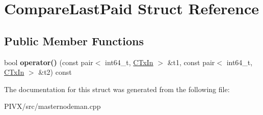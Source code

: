 \hypertarget{struct_compare_last_paid}{}\section{Compare\+Last\+Paid Struct Reference}
\label{struct_compare_last_paid}
\subsection*{Public Member Functions}
\begin{DoxyCompactItemize}
\item 
\mbox{\label{struct_compare_last_paid_aa24cafa94faa955ceebd8791379370f1}} 
bool {\bfseries operator()} (const pair$<$ int64\+\_\+t, \mbox{\hyperlink{class_c_tx_in}{C\+Tx\+In}} $>$ \&t1, const pair$<$ int64\+\_\+t, \mbox{\hyperlink{class_c_tx_in}{C\+Tx\+In}} $>$ \&t2) const
\end{DoxyCompactItemize}


The documentation for this struct was generated from the following file\+:\begin{DoxyCompactItemize}
\item 
P\+I\+V\+X/src/masternodeman.\+cpp\end{DoxyCompactItemize}
